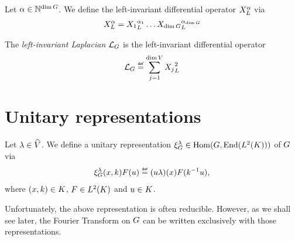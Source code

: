 \begin{definition}
    Let $\alpha \in \mathbb{N}^{\dim G}$.
    We define the left-invariant differential operator $X^{\alpha}_L$ via
    \begin{align*}
        X^{\alpha}_L =
        {X_1}_L^{\alpha_1} \dots
        {X_{\dim G}}_L^{\alpha_{\dim G}}
    \end{align*}
\end{definition}

\begin{definition}
\label{definition:left-invariant_Laplacian}
    The \emph{left-invariant Laplacian} ${\mathcal{L}_{G}}$ is the left-invariant differential operator
    \begin{align*}
        \Laplacian \defeq \sum_{j = 1}^{\dim \VectorSpace} \LeftDifferentialOperatorFirstOrder{X_j}^2
    \end{align*}
\end{definition}

\section{Unitary representations}

\begin{definition}
\label{definition:reducible_representation}
    Let $\lambda \in {\widehat{V}}$.
    We define a unitary representation $\xi^{\lambda}_{G} \in \operatorname{Hom}(G, \operatorname{End}({L^{2} (K)}))$ of $G$ via
    \begin{align}
        \Rep{\lambda} (x, k) F(u) \defeq (u \lambda)(x) F(k^{-1} u),
        \label{eq:reducible_representations_on_the_generalised_motion_groups}
    \end{align}
    where $(x, k) \in K$, $F \in {L^{2} (K)}$ and $u \in K$.
\end{definition}

Unfortunately, the above representation is often reducible.
However, as we shall see later, the Fourier Transform on $G$ can be written exclusively with those representations.

